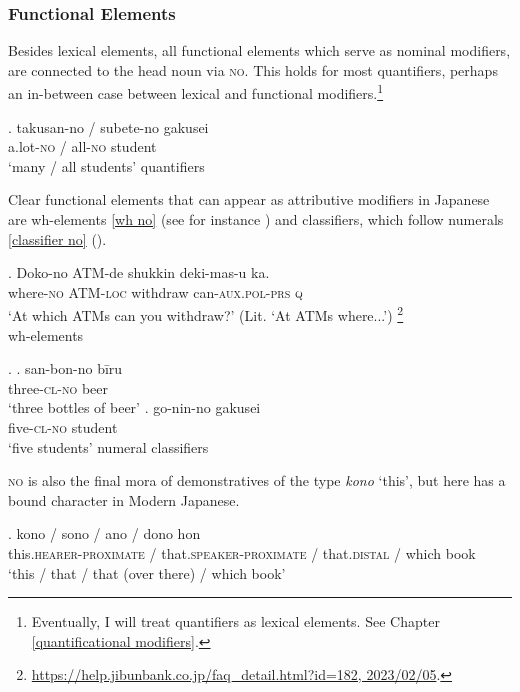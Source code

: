 \documentclass [output=book,colorlinks,citecolor=brown]{langscibook}
\begin{document}

\subsubsection{Functional Elements} \label{grammatical no}

Besides lexical elements, all functional elements which serve as nominal modifiers, are connected to the head noun via \textsc{no}. This holds for most quantifiers, perhaps an in-between case between lexical and functional modifiers.\footnote{Eventually, I will treat quantifiers as lexical elements. See Chapter \ref{quantificational modifiers}.}

\exg. takusan-no / subete-no gakusei\\
a.lot-\textsc{no} / all-\textsc{no} student\\
`many / all students' \hfill \null quantifiers

Clear functional elements that can appear as attributive modifiers in Japanese are wh-elements \ref{wh no} (see for instance \citealt{watanabe:2001:wh}) and classifiers, which follow numerals \ref{classifier no} (\citealt{saito:2008:N}).

\exg. Doko-no ATM-de shukkin deki-mas-u ka.\\
where-\textsc{no} ATM-\textsc{loc} withdraw can-\textsc{aux.pol-prs} \textsc{q}\\
`At which ATMs can you withdraw?’ (Lit. `At ATMs where...’) \label{wh no} \footnote{\url{https://help.jibunbank.co.jp/faq_detail.html?id=182, 2023/02/05}.} \\ \null \hfill wh-elements

 \ex. \label{classifier no} \ag. san-bon-no bīru\\
three-\textsc{cl-no} beer\\
`three bottles of beer’ \label{sanbon}
\bg. go-nin-no gakusei\\
five-\textsc{cl-no} student\\
`five students’ \null \hfill numeral classifiers

\textsc{no} is also the final mora of demonstratives of the type \textit{kono} `this’, but here has a bound character in Modern Japanese.

\exg. kono / sono / ano / dono hon\\
this.\textsc{hearer-proximate} / that.\textsc{speaker-proximate} / that.\textsc{distal} / which book\\
`this / that / that (over there) / which book'
\end{document}
